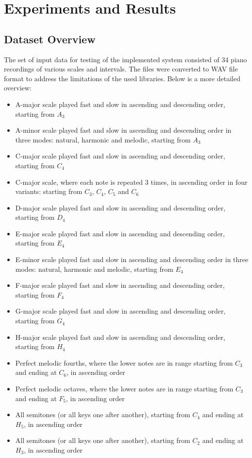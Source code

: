 \chapter{Experiments and Results}\label{chapter:experiments}


\section{Dataset Overview}\label{section:experiments_dataset}

The set of input data for testing of the implemented system consisted of 34 piano recordings of various scales and intervals. The files were converted to WAV file format to address the limitations of the used libraries. Below is a more detailed overview:

\begin{itemize}
	\item A-major scale played fast and slow in ascending and descending order, starting from $A_3$
	\item A-minor scale played fast and slow in ascending and descending order in three modes: natural, harmonic and melodic, starting from $A_3$
	\item C-major scale played fast and slow in ascending and descending order, starting from $C_4$
	\item C-major scale, where each note is repeated 3 times, in ascending order in four variants: starting from $C_3$, $C_4$, $C_5$ and $C_6$
	\item D-major scale played fast and slow in ascending and descending order, starting from $D_4$
	\item E-major scale played fast and slow in ascending and descending order, starting from $E_4$
	\item E-minor scale played fast and slow in ascending and descending order in three modes: natural, harmonic and melodic, starting from $E_4$
	\item F-major scale played fast and slow in ascending and descending order, starting from $F_4$
	\item G-major scale played fast and slow in ascending and descending order, starting from $G_4$
	\item H-major scale played fast and slow in ascending and descending order, starting from $H_4$
	\item Perfect melodic fourths, where the lower notes are in range starting from $C_3$ and ending at $C_6$, in ascending order
	\item Perfect melodic octaves, where the lower notes are in range starting from $C_3$ and ending at $F_5$, in ascending order
	\item All semitones (or all keys one after another), starting from $C_4$ and ending at $H_5$, in ascending order
	\item All semitones (or all keys one after another), starting from $C_2$ and ending at $H_3$, in ascending order
\end{itemize}

